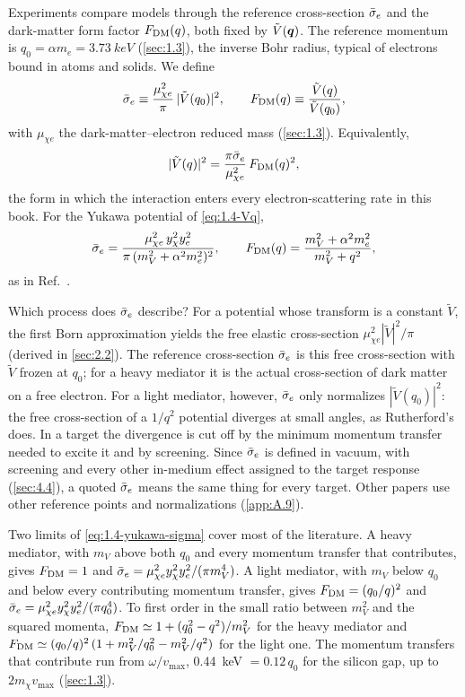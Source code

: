 Experiments compare models through the reference cross-section $\bar{\sigma}_{e}$ and the dark-matter form factor $F_{\mathrm{DM}}(q)$, both fixed by $\tilde V(\bm{q})$. The reference momentum is $q_0 = \alpha m_e = \SI{3.73}{keV}$ (\cref{sec:1.3}), the inverse Bohr radius, typical of electrons bound in atoms and solids. We define~\cites[Eqs.~(3) and (4)]{essig2012direct}[Eqs.~(11) and (12)]{knapen2021dark}
\begin{equation}
  \bar{\sigma}_{e} \equiv \frac{\mu_{\chi e}^2}{\pi}\,|\tilde V(q_0)|^2,
  \qquad
  F_{\mathrm{DM}}(q) \equiv \frac{\tilde V(q)}{\tilde V(q_0)},
  \label{eq:1.4-defs}
\end{equation}
with $\mu_{\chi e}$ the dark-matter--electron reduced mass (\cref{sec:1.3}). Equivalently,
\begin{equation}
  |\tilde V(q)|^2 = \frac{\pi\bar{\sigma}_{e}}{\mu_{\chi e}^2}\,F_{\mathrm{DM}}(q)^2 ,
  \label{eq:1.4-Vsq}
\end{equation}
the form in which the interaction enters every electron-scattering rate in this book. For the Yukawa potential of \cref{eq:1.4-Vq},
\begin{equation}
  \bar{\sigma}_{e} = \frac{\mu_{\chi e}^2\, y_\chi^2 y_e^2}{\pi\,(m_V^2 + \alpha^2 m_e^2)^2},
  \qquad
  F_{\mathrm{DM}}(q) = \frac{m_V^2 + \alpha^2 m_e^2}{m_V^2 + q^2},
  \label{eq:1.4-yukawa-sigma}
\end{equation}
as in Ref.~\cite[Eqs.~(11) and (12)]{knapen2021dark}.

Which process does $\bar{\sigma}_{e}$ describe? For a potential whose transform is a constant $\tilde V$, the first Born approximation yields the free elastic cross-section $\mu_{\chi e}^2|\tilde V|^2/\pi$ (derived in \cref{sec:2.2}). The reference cross-section $\bar{\sigma}_{e}$ is this free cross-section with $\tilde V$ frozen at $q_0$; for a heavy mediator it is the actual cross-section of dark matter on a free electron. For a light mediator, however, $\bar{\sigma}_{e}$ only normalizes $|\tilde V(q_0)|^2$: the free cross-section of a $1/q^2$ potential diverges at small angles, as Rutherford's does. In a target the divergence is cut off by the minimum momentum transfer needed to excite it and by screening. Since $\bar{\sigma}_{e}$ is defined in vacuum, with screening and every other in-medium effect assigned to the target response (\cref{sec:4.4}), a quoted $\bar{\sigma}_{e}$ means the same thing for every target. Other papers use other reference points and normalizations (\cref{app:A.9}).

Two limits of \cref{eq:1.4-yukawa-sigma} cover most of the literature. A heavy mediator, with $m_V$ above both $q_0$ and every momentum transfer that contributes, gives $F_{\mathrm{DM}} = 1$ and $\bar{\sigma}_{e} = \mu_{\chi e}^2 y_\chi^2 y_e^2/(\pi m_V^4)$. A light mediator, with $m_V$ below $q_0$ and below every contributing momentum transfer, gives $F_{\mathrm{DM}} = (q_0/q)^2$ and $\bar{\sigma}_{e} = \mu_{\chi e}^2 y_\chi^2 y_e^2/(\pi q_0^4)$. To first order in the small ratio between $m_V^2$ and the squared momenta, $F_{\mathrm{DM}} \simeq 1 + (q_0^2 - q^2)/m_V^2$ for the heavy mediator and $F_{\mathrm{DM}} \simeq (q_0/q)^2\,(1 + m_V^2/q_0^2 - m_V^2/q^2)$ for the light one. The momentum transfers that contribute run from $\omega/v_{\mathrm{max}}$, \SI{0.44}{keV} $= 0.12\,q_0$ for the silicon gap, up to $2m_\chi v_{\mathrm{max}}$ (\cref{sec:1.3}).

